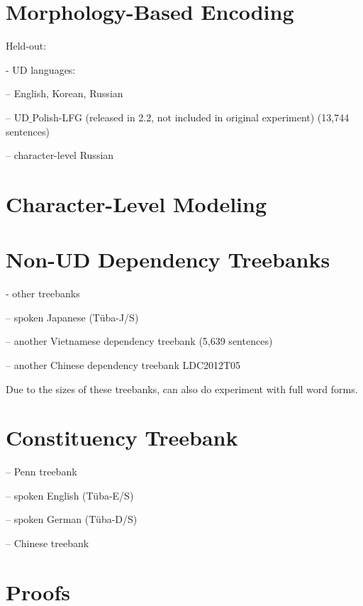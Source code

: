 \documentclass[11pt,letterpaper]{article}
\begin{document}
\section{Morphology-Based Encoding}



Held-out:

- UD languages:

-- English, Korean, Russian

-- UD$\_$Polish-LFG (released in 2.2, not included in original experiment) (13,744 sentences)

-- character-level Russian




\section{Character-Level Modeling}

\section{Non-UD Dependency Treebanks}



- other treebanks



-- spoken Japanese (T{\"u}ba-J/S)

-- another Vietnamese dependency treebank \citep{nguyen-bktreebank:-2017} (5,639 sentences)


-- another Chinese dependency treebank LDC2012T05


Due to the sizes of these treebanks, can also do experiment with full word forms.


\section{Constituency Treebank}

-- Penn treebank \citep{marcus-building-1993}

-- spoken English (T{\"u}ba-E/S)

-- spoken German (T{\"u}ba-D/S)

-- Chinese treebank \citep{xue-chinese-2013}


\section{Proofs}
\end{document}
